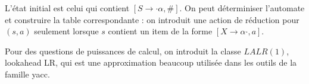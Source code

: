 \documentclass{cours}
\begin{document}
L'état initial est celui qui contient $\left[S \rightarrow \cdot \alpha, \#\right]$. On peut déterminiser l'automate et construire la table correspondante : on introduit une action de réduction pour $(s, a)$ seulement lorsque $s$ contient un item de la forme $\left[X \rightarrow \alpha\cdot, a\right]$.

Pour des questions de puissances de calcul, on introduit la classe $LALR(1)$, lookahead LR, qui est une approximation beaucoup utilisée dans les outils de la famille \textmd{yacc}.
\end{document}
